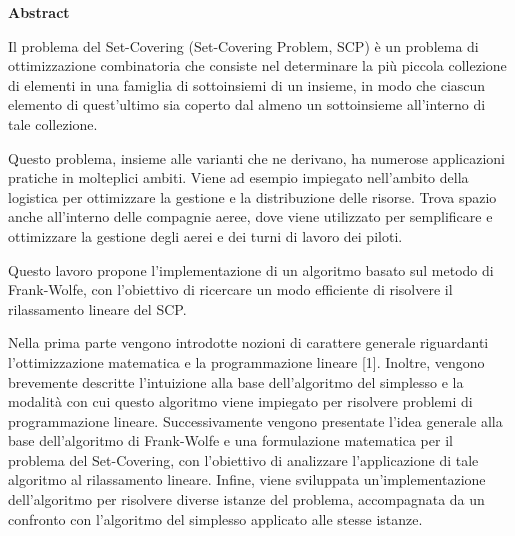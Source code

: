{
\thispagestyle{empty}
\vspace*{40pt}
\begin{center}
\color{primary}
\fontsize{27pt}{0pt}\bfseries\selectfont\alt Abstract
\vspace*{10pt}
\end{center}
}

\noindent
Il problema del Set-Covering (Set-Covering Problem, SCP) è un problema di ottimizzazione combinatoria che consiste nel
determinare la più piccola collezione di elementi in una famiglia di sottoinsiemi di un insieme, in modo che ciascun
elemento di quest'ultimo sia coperto dal almeno un sottoinsieme all'interno di tale collezione.

Questo problema, insieme alle varianti che ne derivano, ha numerose applicazioni pratiche in molteplici ambiti. Viene ad
esempio impiegato nell'ambito della logistica per ottimizzare la gestione e la distribuzione delle risorse. Trova spazio
anche all'interno delle compagnie aeree, dove viene utilizzato per semplificare e ottimizzare la gestione degli aerei e
dei turni di lavoro dei piloti.

Questo lavoro propone l'implementazione di un algoritmo basato sul metodo di Frank-Wolfe, con
l'obiettivo di ricercare un modo efficiente di risolvere il rilassamento lineare del SCP.

Nella prima parte vengono introdotte nozioni di carattere generale riguardanti l'ottimizzazione matematica e la
programmazione lineare [1]. Inoltre, vengono brevemente descritte l'intuizione alla base dell'algoritmo del simplesso e la
modalità con cui questo algoritmo viene impiegato per risolvere problemi di programmazione lineare. Successivamente
vengono presentate l'idea generale alla base dell'algoritmo di Frank-Wolfe e una formulazione matematica per il problema
del Set-Covering, con l'obiettivo di analizzare l'applicazione di tale algoritmo al rilassamento lineare.
Infine, viene sviluppata un'implementazione dell'algoritmo per risolvere diverse istanze del problema, accompagnata da
un confronto con l'algoritmo del simplesso applicato alle stesse istanze.
